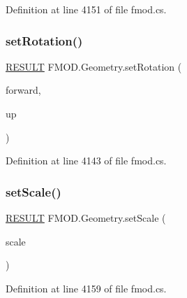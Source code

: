 Definition at line 4151 of file fmod.\+cs.

\mbox{\label{class_f_m_o_d_1_1_geometry_aa1b290acb751d1464c1cb2c5ff85bf22}} 
\subsubsection{\texorpdfstring{set\+Rotation()}{setRotation()}}
{\footnotesize\ttfamily \hyperlink{namespace_f_m_o_d_a305d1176ef3f8c8815861a60407ac33d}{R\+E\+S\+U\+LT} F\+M\+O\+D.\+Geometry.\+set\+Rotation (\begin{DoxyParamCaption}\item[{ref \hyperlink{struct_f_m_o_d_1_1_v_e_c_t_o_r}{V\+E\+C\+T\+OR}}]{forward,  }\item[{ref \hyperlink{struct_f_m_o_d_1_1_v_e_c_t_o_r}{V\+E\+C\+T\+OR}}]{up }\end{DoxyParamCaption})}



Definition at line 4143 of file fmod.\+cs.

\mbox{\label{class_f_m_o_d_1_1_geometry_a44a7ca44b0fd116a3091f0e8ff1ef5db}} 
\subsubsection{\texorpdfstring{set\+Scale()}{setScale()}}
{\footnotesize\ttfamily \hyperlink{namespace_f_m_o_d_a305d1176ef3f8c8815861a60407ac33d}{R\+E\+S\+U\+LT} F\+M\+O\+D.\+Geometry.\+set\+Scale (\begin{DoxyParamCaption}\item[{ref \hyperlink{struct_f_m_o_d_1_1_v_e_c_t_o_r}{V\+E\+C\+T\+OR}}]{scale }\end{DoxyParamCaption})}



Definition at line 4159 of file fmod.\+cs.

\mbox{\label{class_f_m_o_d_1_1_geometry_ad8119f19c0d90e9b18685881b9362585}} 
